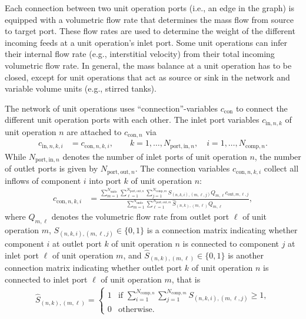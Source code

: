 Each connection between two unit operation ports (i.e., an edge in the graph) is equipped with a volumetric flow rate that determines the mass flow from source to target port.
These flow rates are used to determine the weight of the different incoming feeds at a unit operation's inlet port.
Some unit operations can infer their internal flow rate (e.g., interstitial velocity) from their total incoming volumetric flow rate.
In general, the mass balance at a unit operation has to be closed, except for unit operations that act as source or sink in the network and variable volume units (e.g., stirred tanks).

The network of unit operations uses ``connection''-variables $c_{\text{con}}$ to connect the different unit operation ports with each other.
The inlet port variables $c_{\text{in},n,k}$ of unit operation $n$ are attached to $c_{\text{con},n}$ via 
\begin{align}
	c_{\text{in},n,k,i} &= c_{\text{con},n,k,i}, \qquad k = 1, \dots, N_{\text{port},\text{in},n},\quad i = 1, \dots, N_{\text{comp},n}. \label{eq:NetworkInletConnection}
\end{align}
While $N_{\text{port},\text{in},n}$ denotes the number of inlet ports of unit operation $n$, the number of outlet ports is given by $N_{\text{port},\text{out},n}$.
The connection variables $c_{\text{con},n,k,i}$ collect all inflows of component $i$ into port $k$ of unit operation $n$:
\begin{align}
	c_{\text{con},n,k,i} &= \frac{\sum_{m=1}^{N_{\text{units}}} \sum_{\ell = 1}^{N_{\text{port},\text{out},n}} \sum_{j = 1}^{N_{\text{comp},m}} S_{(n,k,i),(m,\ell,j)} Q_{m,\ell} c_{\text{out},m,\ell,j}}{\sum_{m=1}^{N_{\text{units}}} \sum_{\ell=1}^{N_{\text{port},\text{out},m}} \hat{S}_{(n,k),(m,\ell)} Q_{m,\ell} }, \label{eq:NetworkConnection}
\end{align}
where $Q_{m,\ell}$ denotes the volumetric flow rate from outlet port $\ell$ of unit operation $m$, $S_{(n,k,i),(m,\ell,j)} \in \{0, 1\}$ is a connection matrix indicating whether component $i$ at outlet port $k$ of unit operation $n$ is connected to component $j$ at inlet port $\ell$ of unit operation $m$, and $\hat{S}_{(n,k),(m,\ell)} \in \{0, 1\}$ is another connection matrix indicating whether outlet port $k$ of unit operation $n$ is connected to inlet port $\ell$ of unit operation $m$, that is
\begin{align*}
	\hat{S}_{(n,k),(m,\ell)} = \begin{cases}
		1 & \text{if } \sum_{i = 1}^{N_{\text{comp},n}} \sum_{j = 1}^{N_{\text{comp},m}} S_{(n,k,i),(m,\ell,j)} \geq 1, \\
		0 & \text{otherwise}.
	\end{cases}
\end{align*}

